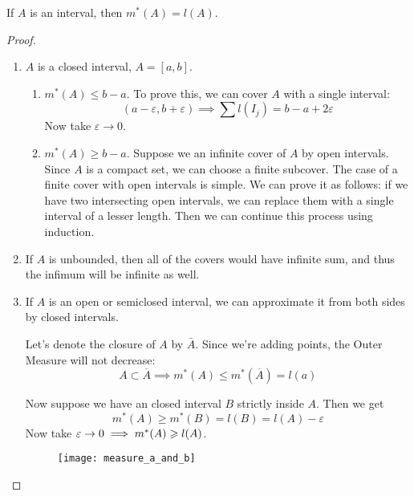 \begin{proposition}
    If $A$ is an interval, then $m^*(A) = l(A)$.
\end{proposition}
\begin{proof}
    \begin{enumerate}[label=\alph*)]
        \item {
            $A$ is a closed interval, $A = [a, b]$.
            \begin{enumerate}[label=\arabic*.]
                \item {
                    $m^*(A) \le b - a$.
                    To prove this, we can cover $A$ with a single interval:
                    \[ (a - \varepsilon, b + \varepsilon) \implies \sum l(I_j) = b - a + 2\varepsilon \]
                    Now take $\varepsilon \to 0$.
                }
                \item {
                    $m^*(A) \ge b - a$.
                    Suppose we an infinite cover of $A$ by open intervals.
                    Since $A$ is a compact set, we can choose a finite subcover.
                    The case of a finite cover with open intervals is simple.
                    We can prove it as follows: if we have two intersecting 
                    open intervals, we can replace them with a single interval
                    of a lesser length. Then we can continue this process using induction.
                }
            \end{enumerate}
        }
        \item {
            If $A$ is unbounded, then all of the covers would have infinite sum, and thus 
            the infimum will be infinite as well.
        }
        \item {
            If $A$ is an open or semiclosed interval, we can approximate it from both sides
            by closed intervals.

            Let's denote the closure of $A$ by $\bar{A}$.
            Since we're adding points, the Outer Measure will not decrease:
            \[ A \subset \overline{A} \implies m^*(A) \le m^*(\overline{A}) = l(a) \]

            \pagebreak
            Now suppose we have an closed interval $B$ strictly inside $A$. Then we get
            \[ m^*(A) \ge m^*(B) = l(B) = l(A) - \varepsilon \]
            Now take $\varepsilon \to 0 \implies m^*(A) \geqslant l(A)$.

            \begin{figure*}[h]
                \centering
                \texttt{[image: measure\_a\_and\_b]}
            \end{figure*}
        }
    \end{enumerate}
\end{proof}